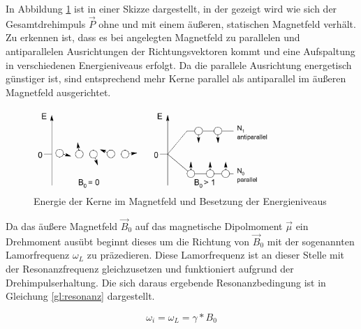In Abbildung \ref{fig:energie} ist in einer Skizze dargestellt, in der gezeigt wird wie sich der Gesamtdrehimpuls $\overrightarrow{P}$ ohne und mit einem äußeren, statischen Magnetfeld verhält. Zu erkennen ist, dass es bei angelegten Magnetfeld zu parallelen und antiparallelen Ausrichtungen der Richtungsvektoren kommt und eine Aufspaltung in verschiedenen Energieniveaus erfolgt. Da die parallele Ausrichtung energetisch günstiger ist, sind entsprechend mehr Kerne parallel als antiparallel im äußeren Magnetfeld ausgerichtet.

\begin{figure}[h!]
	\centering
	\includegraphics[width=0.8\textwidth]{img/energiediagramme}
	\caption{Energie der Kerne im Magnetfeld und Besetzung der Energieniveaus}
	\label{fig:energie}
\end{figure}
\FloatBarrier

Da das äußere Magnetfeld $\overrightarrow{B}_0$ auf das magnetische Dipolmoment $\overrightarrow{\mu}$ ein Drehmoment ausübt beginnt dieses um die Richtung von $\overrightarrow{B}_0$ mit der sogenannten Lamorfrequenz $\omega_L$ zu präzedieren. Diese Lamorfrequenz ist an dieser Stelle mit der Resonanzfrequenz gleichzusetzen und funktioniert aufgrund der Drehimpulserhaltung. Die sich daraus ergebende Resonanzbedingung ist in Gleichung \ref{gl:resonanz} dargestellt.

\begin{equation}
	\label{gl:resonanz}
	\omega_i = \omega_L = \gamma * B_0
\end{equation}

